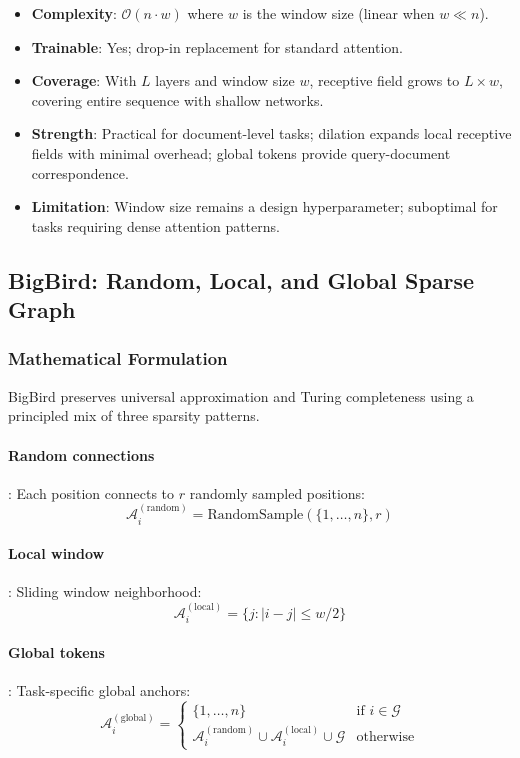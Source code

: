 \begin{itemize}[leftmargin=*]
    \item \textbf{Complexity}: $\mathcal{O}(n \cdot w)$ where $w$ is the window size (linear when $w \ll n$).
    \item \textbf{Trainable}: Yes; drop-in replacement for standard attention.
    \item \textbf{Coverage}: With $L$ layers and window size $w$, receptive field grows to $L \times w$, covering entire sequence with shallow networks.
    \item \textbf{Strength}: Practical for document-level tasks; dilation expands local receptive fields with minimal overhead; global tokens provide query-document correspondence.
    \item \textbf{Limitation}: Window size remains a design hyperparameter; suboptimal for tasks requiring dense attention patterns.
\end{itemize}

\subsection{BigBird: Random, Local, and Global Sparse Graph}

\subsubsection{Mathematical Formulation}

BigBird \citep{zaheer_bigbird_2020} preserves universal approximation and Turing completeness using a principled mix of three sparsity patterns.

\paragraph{Random connections}: Each position connects to $r$ randomly sampled positions:
\[
\mathcal{A}_i^{(\text{random})} = \text{RandomSample}(\{1, \ldots, n\}, r)
\]

\paragraph{Local window}: Sliding window neighborhood:
\[
\mathcal{A}_i^{(\text{local})} = \{j : |i-j| \leq w/2\}
\]

\paragraph{Global tokens}: Task-specific global anchors:
\[
\mathcal{A}_i^{(\text{global})} = \begin{cases}
\{1, \ldots, n\} & \text{if } i \in \mathcal{G} \\
\mathcal{A}_i^{(\text{random})} \cup \mathcal{A}_i^{(\text{local})} \cup \mathcal{G} & \text{otherwise}
\end{cases}
\]

